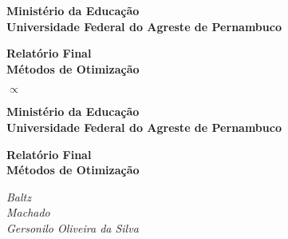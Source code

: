 


\thispagestyle{empty}


\begin{center}
{\huge \textbf{Ministério da Educação}} \\
{\huge \textbf{Universidade Federal do Agreste de Pernambuco}}
\end{center}

\vspace {8cm}

\begin{center}
{\huge \textbf{Relatório Final}} \\
{\huge \textbf{Métodos de Otimização}}
\end{center}




\newpage

\thispagestyle{empty}

\begin{center}
$\propto$
\end{center}




\newpage

\thispagestyle{empty}



\begin{center}
{\huge \textbf{Ministério da Educação}} \\
{\huge \textbf{Universidade Federal do Agreste de Pernambuco}}
\end{center}

\vspace{6cm}

\begin{center}
{\huge \textbf{Relatório Final}} \\
{\huge \textbf{Métodos de Otimização}}
\end{center}

\vspace{5cm}

\begin{center}
{\Large\textit{Baltz}}\\
{\Large\textit{Machado}}\\
{\Large\textit{Gersonilo Oliveira da Silva}}
\end{center}


